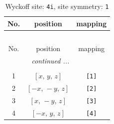 \documentclass[fleqn,8pt]{jsarticle}
\begin{document}
\renewcommand{\arraystretch}{1.2}
\begin{longtable}{ccc}
\caption{Wyckoff site: {\tt 4i}, site symmetry: {\tt 1}}
 \\
 \hline \hline
No. & position & mapping \\ \hline \endfirsthead

\multicolumn{2}{l}{\tablename\ \thetable{}} \\
 \hline \hline
No. & position & mapping \\ \hline \endhead

 \hline \hline
\multicolumn{2}{r}{\footnotesize\it continued ...} \\ \endfoot

 \hline \hline
\multicolumn{2}{r}{} \\ \endlastfoot

1 & $\left[ x,\, y,\, z \right]$ & {\tt [1]} \\ \hline
2 & $\left[ - x,\, - y,\, z \right]$ & {\tt [2]} \\ \hline
3 & $\left[ x,\, - y,\, z \right]$ & {\tt [3]} \\ \hline
4 & $\left[ - x,\, y,\, z \right]$ & {\tt [4]} \\
\end{longtable}
\end{document}

